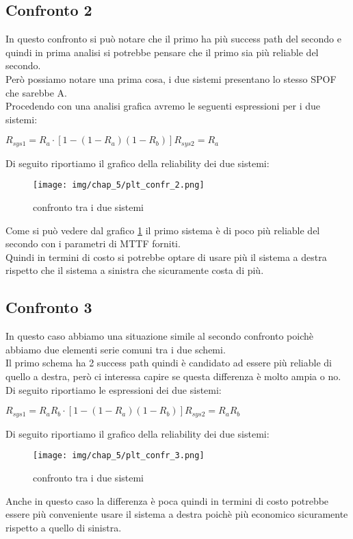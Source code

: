 \subsection{Confronto 2}
In questo confronto si può notare che il primo ha più success path del secondo e quindi in prima analisi si potrebbe pensare che il primo sia più reliable del secondo.\\
Però possiamo notare una prima cosa, i due sistemi presentano lo stesso SPOF che sarebbe A.\\
Procedendo con una analisi grafica avremo le seguenti espressioni per i due sistemi:
\begin{center}
    $
    R_{sys1} = R_a \cdot [1-(1-R_a)(1-R_b)]
    R_{sys2} = R_a
    $
\end{center}
Di seguito riportiamo il grafico della reliability dei due sistemi:
\begin{figure}[H]
    \centering
    \texttt{[image: img/chap\_5/plt\_confr\_2.png]}
    \caption{confronto tra i due sistemi}
    \label{fig:cofr2_sys}
\end{figure}
\noindent
Come si può vedere dal grafico \ref{fig:cofr2_sys} il primo sistema è di poco più reliable del secondo con i parametri di MTTF forniti.\\
Quindi in termini di costo si potrebbe optare di usare più il sistema a destra rispetto che il sistema a sinistra che sicuramente costa di più.
\subsection{Confronto 3}
In questo caso abbiamo una situazione simile al secondo confronto poichè abbiamo due elementi serie comuni tra i due schemi.\\
Il primo schema ha 2 success path quindi è candidato ad essere più reliable di quello a destra, però ci interessa capire se questa differenza è molto ampia o no.\\
Di seguito riportiamo le espressioni dei due sistemi:
\begin{center}
    $
    R_{sys1} = R_a R_b \cdot [1-(1-R_a)(1-R_b)]
    R_{sys2} = R_a R_b
    $
\end{center}
Di seguito riportiamo il grafico della reliability dei due sistemi:
\begin{figure}[H]
    \centering
    \texttt{[image: img/chap\_5/plt\_confr\_3.png]}
    \caption{confronto tra i due sistemi}
    \label{fig:cofr3_sys}
\end{figure}
\noindent
Anche in questo caso la differenza è poca quindi in termini di costo potrebbe essere più conveniente usare il sistema a destra poichè più economico sicuramente rispetto a quello di sinistra.
